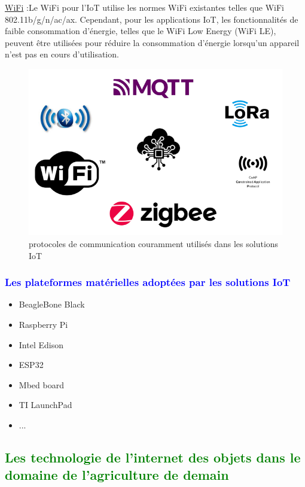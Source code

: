 \begin{flushleft}
	 \underline{WiFi} :Le WiFi pour l'IoT utilise les normes WiFi existantes telles que WiFi 802.11b/g/n/ac/ax. Cependant, pour les applications IoT, les fonctionnalités de faible consommation d'énergie, telles que le WiFi Low Energy (WiFi LE), peuvent être utilisées pour réduire la consommation d'énergie lorsqu'un appareil n'est pas en cours d'utilisation.
		\begin{figure}[h]
			\centering
			\includegraphics{chapitres/images/Iot-protocol.PNG}
			\caption{protocoles de communication couramment utilisés dans les solutions IoT}
			\label{fig:labelname}
		\end{figure}
	\newpage
	\subsubsection{\textcolor{blue}{Les plateformes matérielles adoptées par les solutions IoT}}
 	\begin{itemize}
 		\item  BeagleBone Black
 		\item  	Raspberry Pi
 		\item  	Intel Edison
 		\item  	ESP32
 		\item  	Mbed board
 		\item  	TI LaunchPad
 		\item  	...
 	\end{itemize}
	
	\subsection{\textcolor{green}{Les technologie de l’internet des objets dans le domaine de l’agriculture de demain}}
	

\end{flushleft}
